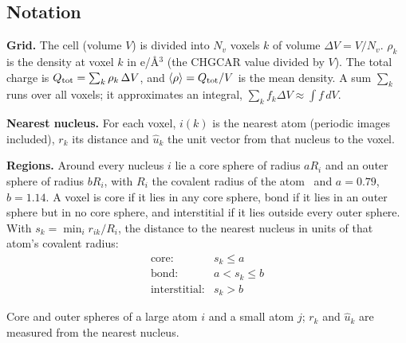 \documentclass[11pt,a4paper]{article}
\begin{document}
\subsection{Notation}
\begin{minipage}[t]{0.56\linewidth}
\vspace{0pt}
\textbf{Grid.} The cell (volume $V$) is divided into $N_v$ voxels $k$ of volume $\Delta V = V/N_v$. $\rho_k$ is the
density at voxel $k$ in e/\AA$^3$ (the CHGCAR value divided by $V$). The total charge is
$Q_{\rm tot}=\sum_k \rho_k\,\Delta V$, and $\langle\rho\rangle = Q_{\rm tot}/V$ is the mean density.
A sum $\sum_k$ runs over all voxels; it approximates an integral, $\sum_k f_k\Delta V\approx\int f\,dV$.

\textbf{Nearest nucleus.} For each voxel, $i(k)$ is the nearest atom (periodic images included),
$r_k$ its distance and $\hat u_k$ the unit vector from that nucleus to the voxel.

\textbf{Regions.} Around every nucleus $i$ lie a core sphere of radius $aR_i$ and an outer
sphere of radius $bR_i$, with $R_i$ the covalent radius of the atom~\cite{cordero} and $a=0.79$,
$b=1.14$. A voxel is core if it lies in any core sphere, bond if it lies in an outer sphere but in no
core sphere, and interstitial if it lies outside every outer sphere. With
$s_k=\min_i r_{ik}/R_i$, the distance to the nearest nucleus in units of that atom's covalent
radius:
\[
\begin{array}{ll}
\text{core:} & s_k \le a\\
\text{bond:} & a < s_k \le b\\
\text{interstitial:} & s_k > b
\end{array}
\]
\end{minipage}\hfill
\begin{minipage}[t]{0.40\linewidth}
\vspace{0pt}
\centering
{}

{\small Core and outer spheres of a large atom $i$ and a small atom $j$; $r_k$ and $\hat u_k$
are measured from the nearest nucleus.}
\end{minipage}
\end{document}
